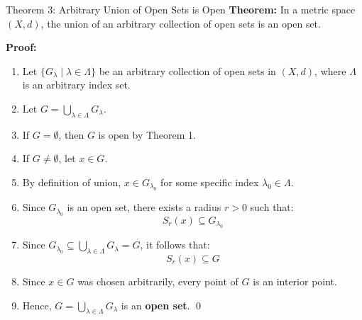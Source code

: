 \documentclass[11pt,a4paper]{article}
\begin{document}
\begin{center}
\end{center}

\newpage

\begin{exbox}{Theorem 3: Arbitrary Union of Open Sets is Open}
\textbf{Theorem:} In a metric space $(X, d)$, the union of an arbitrary collection of open sets is an open set.

\textbf{Proof:}
\begin{enumerate}
    \item Let $\{G_\lambda \mid \lambda \in \Lambda\}$ be an arbitrary collection of open sets in $(X, d)$, where $\Lambda$ is an arbitrary index set.
    \item Let $G = \bigcup_{\lambda \in \Lambda} G_\lambda$.
    \item If $G = \emptyset$, then $G$ is open by Theorem 1.
    \item If $G \neq \emptyset$, let $x \in G$.
    \item By definition of union, $x \in G_{\lambda_0}$ for some specific index $\lambda_0 \in \Lambda$.
    \item Since $G_{\lambda_0}$ is an open set, there exists a radius $r > 0$ such that:
    \begin{equation}
        S_r(x) \subseteq G_{\lambda_0}
    \end{equation}
    \item Since $G_{\lambda_0} \subseteq \bigcup_{\lambda \in \Lambda} G_\lambda = G$, it follows that:
    \begin{equation}
        S_r(x) \subseteq G
    \end{equation}
    \item Since $x \in G$ was chosen arbitrarily, every point of $G$ is an interior point.
    \item Hence, $G = \bigcup_{\lambda \in \Lambda} G_\lambda$ is an \textbf{open set}. \qed
\end{enumerate}
\end{exbox}
\end{document}

